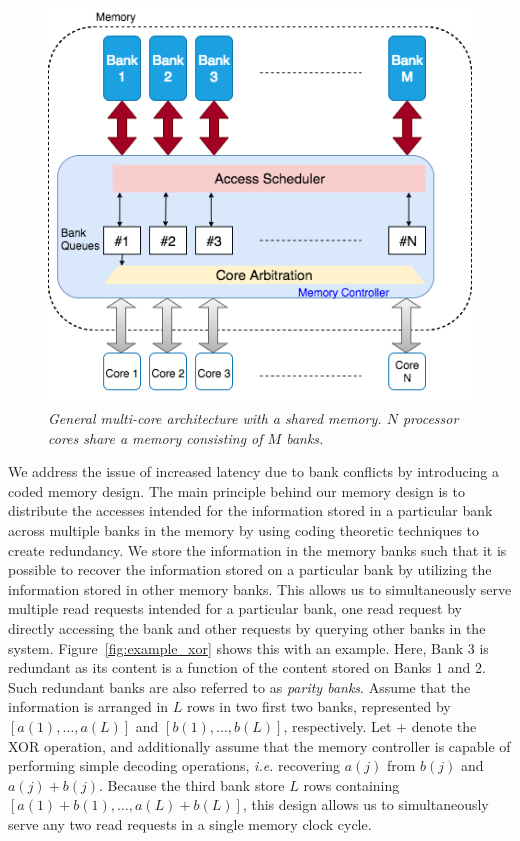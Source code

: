 \begin{figure}[t!]
\centering
\includegraphics[width=\linewidth]{fig/fig-2-memory-controller.png}
\caption{\it{General multi-core architecture with a shared memory. $N$ processor cores share a memory consisting of $M$ banks.}}
\label{fig:multicore_arch}
\end{figure}
We address the issue of increased latency due to bank conflicts by introducing a coded memory design. The main principle behind our memory design is to distribute the accesses intended for the information stored in a particular bank across multiple banks in the memory by using coding theoretic techniques to create redundancy. We store the information in the memory banks such that it is possible to recover the information stored on a particular bank by utilizing the information stored in other memory banks. This allows us to simultaneously serve multiple read requests intended for a particular bank, one read request by directly accessing the bank and other requests by querying other banks in the system. Figure~\ref{fig:example_xor} shows this with an example. Here, Bank 3 is redundant as its content is a function of the content stored on Banks 1 and 2. Such redundant banks are also referred to as {\em parity banks}. Assume that the information is arranged in $L$ rows in two first two banks, represented by $[a(1),\ldots, a(L)]$ and $[b(1),\ldots, b(L)]$, respectively. 
Let $+$ denote the XOR operation, and additionally assume that the memory controller is capable of performing simple decoding operations, \textit{i.e.} recovering $a(j)$ from $b(j)$ and $a(j) + b(j)$.
Because the third bank store $L$ rows containing $[a(1) + b(1),\ldots, a(L) + b(L)]$, this design allows us to simultaneously serve any two read requests in a single memory clock cycle. 

